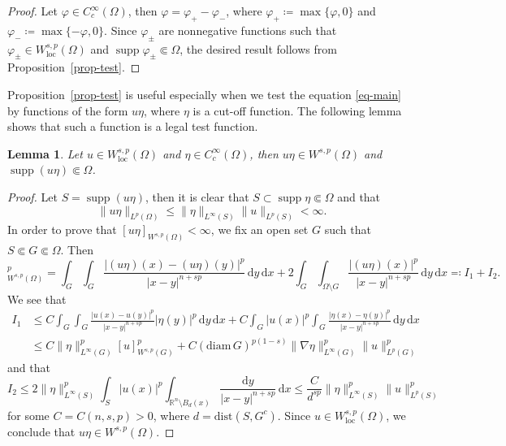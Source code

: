 \documentclass[11pt]{amsart}
\theoremstyle{plain}
\newtheorem{lemma}[theorem]{Lemma}
\theoremstyle{definition}
\numberwithin{equation}{section}
\DeclareMathOperator{\supp}{supp}
\begin{document}
\begin{proof}
    Let $\varphi \in C^\infty_c(\Omega)$, then $\varphi=\varphi_+-\varphi_-$, where $\varphi_+\coloneqq\max\{\varphi, 0\}$ and $\varphi_-\coloneqq \max\{-\varphi, 0\}$. Since $\varphi_\pm$ are nonnegative functions such that $\varphi_\pm \in W^{s, p}_{\mathrm{loc}}(\Omega)$ and $\supp{\varphi_{\pm}} \Subset \Omega$, the desired result follows from Proposition~\ref{prop-test}.
\end{proof}

Proposition~\ref{prop-test} is useful especially when we test the equation \eqref{eq-main} by functions of the form $u\eta$, where $\eta$ is a cut-off function. The following lemma shows that such a function is a legal test function.

\begin{lemma}\label{lem-test-prod}
Let $u \in W^{s, p}_{\mathrm{loc}}(\Omega)$ and $\eta \in C^\infty_c(\Omega)$, then $u\eta \in W^{s, p}(\Omega)$ and $\supp{(u\eta)} \Subset \Omega$.
\end{lemma}

\begin{proof}
Let $S=\supp{(u\eta)}$, then it is clear that $S \subset \supp{\eta} \Subset \Omega$ and that
\begin{equation*}
\|u\eta\|_{L^p(\Omega)} \leq \|\eta\|_{L^\infty(S)} \|u\|_{L^p(S)} < \infty.
\end{equation*}
In order to prove that $[u\eta]_{W^{s, p}(\Omega)} < \infty$, we fix an open set $G$ such that $S \Subset G \Subset \Omega$. Then
\begin{equation*}
[u\eta]_{W^{s, p}(\Omega)}^p = \int_G \int_G \frac{|(u\eta)(x)-(u\eta)(y)|^p}{|x-y|^{n+sp}} \,\mathrm{d}y \,\mathrm{d}x + 2 \int_G \int_{\Omega \setminus G} \frac{|(u\eta)(x)|^p}{|x-y|^{n+sp}} \,\mathrm{d}y \,\mathrm{d}x \eqqcolon I_1 + I_2.
\end{equation*}
We see that
\begin{align*}
I_1
&\leq C \int_G \int_G \frac{|u(x)-u(y)|^p}{|x-y|^{n+sp}} |\eta(y)|^p \,\mathrm{d}y \,\mathrm{d}x + C \int_G |u(x)|^p \int_G \frac{|\eta(x)-\eta(y)|^p}{|x-y|^{n+sp}} \,\mathrm{d}y \,\mathrm{d}x \\
&\leq C \|\eta\|_{L^\infty(G)}^p [u]_{W^{s, p}(G)}^p + C(\mathrm{diam}\,G)^{p(1-s)} \|\nabla \eta\|_{L^\infty(G)}^p \|u\|_{L^p(G)}^p
\end{align*}
and that
\begin{equation*}
I_2 \leq 2\|\eta\|_{L^\infty(S)}^p \int_S |u(x)|^p \int_{\mathbb{R}^n \setminus B_d(x)} \frac{\mathrm{d}y}{|x-y|^{n+sp}} \,\mathrm{d}x \leq \frac{C}{d^{sp}} \|\eta\|_{L^\infty(S)}^p \|u\|_{L^p(S)}^p
\end{equation*}
for some $C=C(n, s, p) > 0$, where $d=\mathrm{dist}(S, G^c)$. Since $u \in W^{s ,p}_{\mathrm{loc}}(\Omega)$, we conclude that $u\eta \in W^{s, p}(\Omega)$.
\end{proof}
\end{document}
